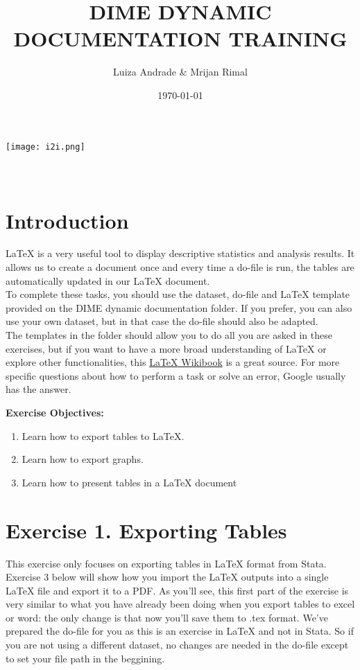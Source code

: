 \documentclass[12pts]{report}
\title{DIME DYNAMIC DOCUMENTATION TRAINING }
\author{Luiza Andrade \& Mrijan Rimal}
\date{\today}
\begin{document}
	

\makeatletter
\begin{titlepage}
	\begin{center}
		\texttt{[image: i2i.png]}\\[10ex]
		{\LARGE \bfseries  \@title }\\[2ex] 
		{\Large  \@author}\\[20ex] 
		{\large \@date}
	\end{center}
\end{titlepage}
\makeatother

\section*{Introduction}
{\LaTeX} is a very useful tool to display descriptive statistics and analysis results. It allows us to create a document once and every time a do-file is run, the tables are automatically updated in our LaTeX document. \\

To complete these tasks, you should use the dataset, do-file and {\LaTeX} template provided on the DIME dynamic documentation folder. If you prefer, you can also use your own dataset, but in that case the do-file should also be adapted. \\

The templates in the folder should allow you to do all you are asked in these exercises, but if you want to have a more broad understanding of {\LaTeX} or explore other functionalities, this \href{https://en.wikibooks.org/wiki/LaTeX
}{{\LaTeX} Wikibook} is a great source. For more specific questions about how to perform a task or solve an error, Google usually has the answer.

\textbf{Exercise Objectives:}
\begin{enumerate}
	\item Learn how to export tables to {\LaTeX}.
	\item Learn how to export graphs.
	\item Learn how to present tables in a {\LaTeX} document
\end{enumerate}

\section*{Exercise 1. Exporting Tables}
This exercise only focuses on exporting tables in {\LaTeX} format from Stata. Exercise 3 below will show how you import the LaTeX outputs into a single {\LaTeX} file and export it to a PDF. As you'll see, this first part of the exercise is very similar to what you have already been doing when you export tables to excel or word: the only change is that now you'll save them to .tex format. We've prepared the do-file for you as this is an exercise in {\LaTeX} and not in Stata. So if you are not using a different dataset, no changes are needed in the do-file except to set your file path in the beggining. \\
\end{document}
